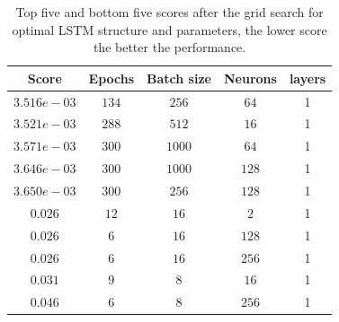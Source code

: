                 
                
                \begin{table}[]
                    \centering
                    \begin{tabular}{ccccc}
                        \toprule
                        \textbf{Score}       & \textbf{Epochs}    & \textbf{Batch size}    & \textbf{Neurons}   & \textbf{layers}   \\ \midrule
                        $3.516e-03$     & $134$     & $256$          & $64$     & 1        \\ 
                        $3.521e-03$     & $288$     & $512$          & $16$      & 1        \\
                        $3.571e-03$     & $300$     & $1000$          & $64$      & 1    \\ 
                        $3.646e-03$     & $300$     & $1000$         & $128$      & 1   \\ 
                        $3.650e-03$     & $300$     & $256$         & $128$     & 1  \\ 
                        $0.026$         & $12$     & $16$          & $2$      & 1     \\
                        $0.026$         & $6$     & $16$        & $128$       & 1    \\ 
                        $0.026$         & $6$     & $16$        & $256$       & 1       \\ 
                        $0.031$         & $9$     & $8$          & $16$     & 1          \\
                        $0.046$         & $6$     & $8$          & $256$     & 1      \\ \bottomrule
                    \end{tabular}
                    \caption{Top five and bottom five scores after the grid search for optimal LSTM structure and parameters, the lower score the better the performance.}
                    \label{tab:lstm_gri}
                \end{table}
                
